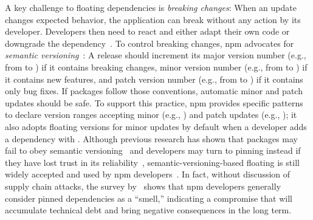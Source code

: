 A key challenge to floating dependencies is \textit{breaking changes}: When an update changes expected behavior, the application can break without any action by its developer. Developers then need to react and either adapt their own code or downgrade the dependency~\cite{DBLP:journals/tosem/BogartKHT21}.
To control breaking changes, npm advocates for \emph{semantic versioning}~\cite{npm-semver}: A release should increment its major version number (e.g., from  to ) if it contains breaking changes, minor version number (e.g., from  to ) if it contains new features, and patch version number (e.g., from  to ) if it contains only bug fixes. If packages follow those conventions, automatic minor and patch updates should be safe. 
To support this practice, npm provides specific patterns to declare version ranges accepting minor (e.g., ) and patch updates (e.g., ); it also adopts floating versions for minor updates by default when a developer adds a dependency with  .
Although previous research has shown that 
packages may fail to obey semantic versioning~\cite{DBLP:journals/jss/RaemaekersDV17, semantic-versioning-sucks, DBLP:conf/kbse/ZhangLXCF0022, DBLP:conf/issta/JayasuriyaT0OB23} and developers may turn to pinning instead if they have lost trust in its reliability~\cite{stop-version-range, semantic-versioning-sucks},
 semantic-versioning-based floating is still widely accepted and used by npm developers~\cite{DBLP:conf/msr/0001PSTB19, DBLP:journals/tse/DecanM21, DBLP:conf/msr/PinckneyCGB23, DBLP:journals/tse/JafariCAST22}.
In fact, without discussion of supply chain attacks, the survey by~\citet{DBLP:journals/tse/JafariCAST22} shows that npm developers generally consider pinned dependencies as a ``smell,'' indicating a compromise that will accumulate technical debt and bring negative consequences in the long term.

